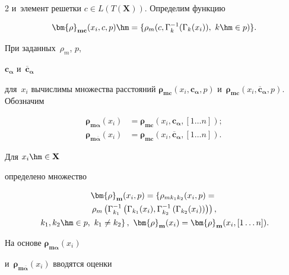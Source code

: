 \begin{multicols}{2}
     и~элемент решетки $c\in L(T(\mathbf{X}))$. Определим функцию 

$$

\bm{\rho}_{\mathbf{mc}} (x_i, c, {p}) \hm= \{ \rho_m(c, \Gamma_k^{-1}(\Gamma_k (x_i)),\ k\hm\in {p})\}.

$$

 При заданных~$\rho_m$, $p$, 

$\mathbf{c}_{\bm{\alpha}}$ и~$\overline{\mathbf{c}}_{\bm{\alpha}}$ 

для~$x_i$ вычислимы множества расстояний $\bm{\rho}_{\mathbf{mc}}(x_i, 

\mathbf{c}_{\bm{\alpha}}, {p})$ и~$\bm{\rho}_{\mathbf{mc}}(x_i, 

\overline{\mathbf{c}}_{\bm{\alpha}}, {p})$. Обозначим 

\begin{align*}

\bm{\rho}_{\mathbf{m}\bm{\alpha}}(x_i) &=  \bm{\rho}_{\mathbf{mc}} 

(x_i, \mathbf{c}_{\bm{\alpha}}, [1\ldots n]); \\

\bm{\rho}_{\mathbf{m}\overline{\bm{\alpha}}} (x_i) &= 

\bm{\rho}_{\mathbf{mc}}(x_i, \overline{\mathbf{c}}_{\bm{\alpha}} , [1\ldots n]).

\end{align*}

 Для $x_i\hm\in \mathbf{X}$ 

определено множество 

\begin{multline*}

\bm{\rho}_{\mathbf{m}}(x_i,{p})=\left \{ \rho_{mk_1k_2}(x_i, {p}) = {}\right.\\

{}\rho_m\left(\Gamma^{-1}_{k_1}\left(\Gamma_{k_1}(x_i), \Gamma^{-1}_{k_2}\left(\Gamma_{k_2}(x_i)\right)\right)\right),\\

\left. k_1, k_2\hm \in {p},\  k_1\not= k_2\right\},\ \bm{\rho}_{\mathbf{m}}(x_i)=  \bm{\rho}_{\mathbf{m}}(x_i, [1\ldots n]).

\end{multline*}

     

     На основе $\bm{\rho}_{\mathbf{m}{\bm{\alpha}}}(x_i)$ 

и~$\bm{\rho}_{\mathbf{m}\overline{\bm{\alpha}}}(x_i)$ вводятся оценки 


\end{multicols}
